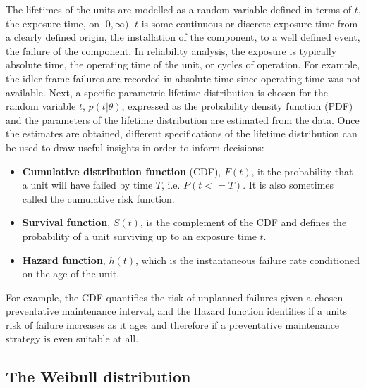The lifetimes of the units are modelled as a random variable defined in terms of $t$, the exposure time, on $[0, \infty)$. $t$ is some continuous or discrete exposure time from a clearly defined origin, the installation of the component, to a well defined event, the failure of the component. In reliability analysis, the exposure is typically absolute time, the operating time of the unit, or cycles of operation. For example, the idler-frame failures are recorded in absolute time since operating time was not available. Next, a specific parametric lifetime distribution is chosen for the random variable $t$, $p(t|\theta)$, expressed as the probability density function (PDF) and the parameters of the lifetime distribution are estimated from the data. Once the estimates are obtained, different specifications of the lifetime distribution can be used to draw useful insights in order to inform decisions:
\begin{itemize}
    \item \textbf{Cumulative distribution function} (CDF), $F(t)$, it the probability that a unit will have failed by time $T$, i.e. $P(t <= T)$. It is also sometimes called the cumulative risk function.
    \item \textbf{Survival function}, $S(t)$, is the complement of the CDF and defines the probability of a unit surviving up to an exposure time $t$.
    \item \textbf{Hazard function}, $h(t)$, which is the instantaneous failure rate conditioned on the age of the unit.
\end{itemize}
For example, the CDF quantifies the risk of unplanned failures given a chosen preventative maintenance interval, and the Hazard function identifies if a units risk of failure increases as it ages and therefore if a preventative maintenance strategy is even suitable at all.

\subsection{The Weibull distribution}


